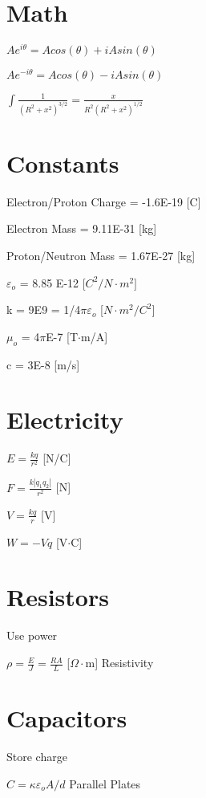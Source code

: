 \documentclass{article}
\begin{document}
\raggedright
\section{Math}

\LARGE ${Ae^{i\theta}=Acos(\theta)+iAsin(\theta)}$

\LARGE ${Ae^{-i\theta}=Acos(\theta)-iAsin(\theta)}$

\LARGE ${\int \frac{1}{(R^2+x^2)^{3/2}}=\frac{x}{R^2(R^2+x^2)^{1/2}}}$


\section{Constants}
\Large {Electron/Proton Charge = -1.6E-19 [C]}

\Large {Electron Mass = 9.11E-31 [kg]}

\Large {Proton/Neutron Mass = 1.67E-27 [kg]}

\Large {$\varepsilon_o$ = 8.85 E-12 [$C^2/N\cdot{m^2}]$}

\Large {k = 9E9 = 1/4$\pi\varepsilon_o$ [$N\cdot{m^2}/{C^2}]$}

\Large {$\mu_o$ = 4$\pi$E-7 [T$\cdot$m/A]}

\Large {c = 3E-8 [m/s]}


\section{Electricity}

\LARGE ${E=\frac{kq}{r^2}} $  \large{[N/C]}

\LARGE ${F=\frac{k|q_1q_2|}{r^2}}$ \large{[N]}

\LARGE ${V=\frac{kq}{r}}$ \large{[V]}

\LARGE ${W=-Vq}$ \large{[V$\cdot$C]}

\section{Resistors}

\large Use power

\LARGE ${\rho=\frac{E}{J}=\frac{RA}{L}}$ \large{[$\Omega\cdot$m]}
\large{Resistivity}

\section{Capacitors}

\large Store charge

\LARGE$C =\kappa\varepsilon_oA/d$
\large{Parallel Plates}
\end{document}
